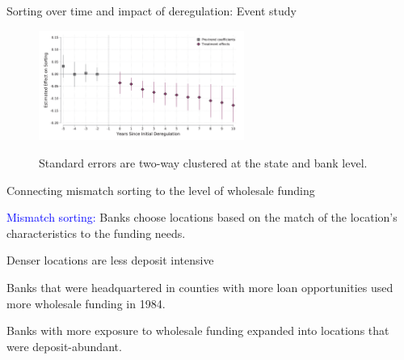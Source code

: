 \documentclass[notes,10pt, aspectratio=169]{beamer}
\newenvironment{wideitemize}{\itemize\addtolength{\itemsep}{10pt}}{\enditemize}
\begin{document}
\begin{frame}{Sorting over time and impact of deregulation: Event study}
    \begin{figure}
        \centering
        \includegraphics[width=0.6\textwidth]{imgs/fig11.png}
        \label{fig:my_label}
        \caption*{Standard errors are two-way clustered at the state and bank level.}
    \end{figure}
    
    \end{frame}



    \begin{frame}{Connecting mismatch sorting to the level of wholesale funding}\label{mismatch_sorting}

        \vspace{0.1cm}

        \textcolor{blue}{Mismatch sorting:} Banks choose locations based on the match of the location's characteristics to the funding needs.
        \begin{wideitemize}
            \item Denser locations are less deposit intensive \hyperlink{mismatch_sorting1}{}
            
            \item Banks that were headquartered in counties with more loan opportunities used more wholesale funding in 1984. 
            \hyperlink{mismatch_sorting2}{}
            
            \item Banks with more exposure to wholesale funding expanded into locations that were deposit-abundant.
            \hyperlink{mismatch_sorting3}{}

        \end{wideitemize}
            
        
        \end{frame}
\end{document}
